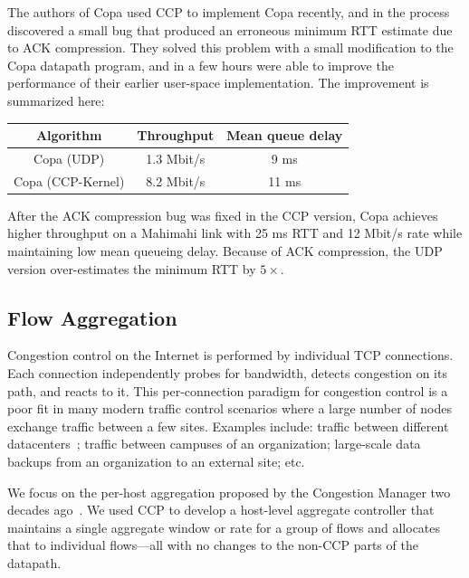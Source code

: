 The authors of Copa used CCP to implement Copa recently, and in the process discovered a small bug that produced an erroneous minimum RTT estimate due to ACK compression. They solved this problem with a small modification to the Copa datapath program,
and in a few hours were able to improve the performance of their earlier user-space implementation. The improvement is summarized here:\\

    \begin{tabular}{c|c|c}
        Algorithm & Throughput & Mean queue delay \\
        \hline
        Copa (UDP) & 1.3 Mbit/s & 9 ms\\
        Copa (CCP-Kernel) & 8.2 Mbit/s  & 11 ms\\
    \end{tabular}

\smallskip
After the ACK compression bug was fixed in the CCP version, Copa achieves higher throughput on a Mahimahi link with 25 ms RTT and 12 Mbit/s rate while maintaining low mean queueing delay. Because of ACK compression, the UDP version over-estimates the minimum RTT by $5\times$.

\subsection{Flow Aggregation}
\label{s:capabilities:agg}

Congestion control on the Internet is performed by individual TCP connections. Each connection independently probes for bandwidth, detects congestion on its path, and reacts to it.
This per-connection paradigm for congestion control is a poor fit in many modern traffic control scenarios where a large number of nodes exchange traffic between a few sites.
Examples include: traffic between different datacenters~\cite{b4, swan}; traffic between campuses of an organization; large-scale data backups from an organization to an external site; etc.

We focus on the per-host aggregation proposed by the
Congestion Manager two decades ago~\cite{cm}. We used CCP to develop a
host-level aggregate controller that maintains a single aggregate window or rate
for a group of flows and allocates that to individual flows---all with no
  changes to the non-CCP parts of the datapath.

%

